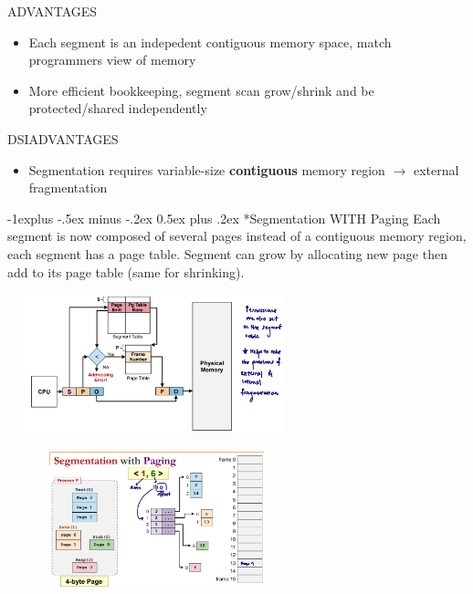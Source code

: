 \documentclass[10pt,landscape]{article}
\makeatletter
\renewcommand{\subsection}{\@startsection{section}{1}{0mm}%
                                {-1ex plus -.5ex minus -.2ex}%
                                {0.5ex plus .2ex}%
                                {\normalfont\large\bfseries}}
\renewcommand{\subsection}{\@startsection{subsection}{2}{0mm}%
                                {-1explus -.5ex minus -.2ex}%
                                {0.5ex plus .2ex}%
                                {\normalfont\normalsize\bfseries}}
\makeatother
\begin{document}
\begin{multicols*}{3}
ADVANTAGES
\begin{itemize}[topsep=0pt,noitemsep,wide=0pt, leftmargin=\dimexpr{} + 2\relax]
    \item Each segment is an indepedent contiguous memory space, match programmers view of memory
    \item More efficient bookkeeping, segment scan grow/shrink and be protected/shared independently
\end{itemize}

DSIADVANTAGES
\begin{itemize}[topsep=0pt,noitemsep,wide=0pt, leftmargin=\dimexpr{} + 2\relax]
    \item Segmentation requires variable-size \textbf{contiguous} memory region $\rightarrow$ external fragmentation
\end{itemize}


\subsection*{Segmentation WITH Paging}
Each segment is now composed of several pages instead of a contiguous memory region, each segment has a page table.
Segment can grow by allocating new page then add to its page table (same for shrinking).

\includegraphics[width=8.5cm, height=4cm]{images/segmentationpaging.png}

\includegraphics[width=8.5cm, height=4cm]{images/segmentationpaging2.png}


\end{multicols*}
\end{document}

